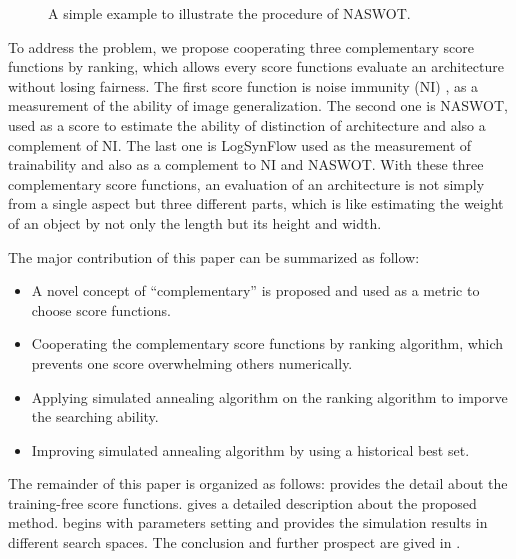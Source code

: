 \documentclass[sigconf]{acmart}
\begin{document}
    \begin{figure*}[b]
        \vspace{-\baselineskip}
        \caption{A simple example to illustrate the procedure of NASWOT.}
        \label{fig:naswot}
        \centering
        \vspace{-\baselineskip}
    \end{figure*}
    To address the problem, we propose cooperating three complementary 
    score functions by ranking, which allows every score functions 
    evaluate an architecture without losing fairness. 
    The first score function is noise immunity (NI) \cite{10092788}, as 
    a measurement of the ability of image generalization. 
    The second one is NASWOT, used as a score to estimate the ability of distinction 
    of architecture and also a complement of NI. 
    The last one is LogSynFlow used as the measurement of trainability 
    and also as a complement to NI and NASWOT. 
    With these three complementary score functions, an evaluation of an 
    architecture is not simply from a single aspect but three different 
    parts, which is like estimating the weight of an object by not only 
    the length but its height and width. 

    The major contribution of this paper can be summarized as follow:
    \begin{itemize}
        \item A novel concept of ``complementary'' is proposed and used as a metric to choose score functions. 
        \item Cooperating the complementary score functions by ranking algorithm, which prevents one score overwhelming others numerically. 
        \item Applying simulated annealing algorithm on the ranking algorithm to imporve the searching ability. 
        \item Improving simulated annealing algorithm by using a historical best set. 
    \end{itemize}
    
    The remainder of this paper is organized as follows: 
     provides the detail about the training-free 
    score functions.  gives a detailed 
    description about the proposed method.  begins 
    with parameters setting and provides the simulation results in 
    different search spaces. The conclusion and further 
    prospect are gived in .
\end{document}
